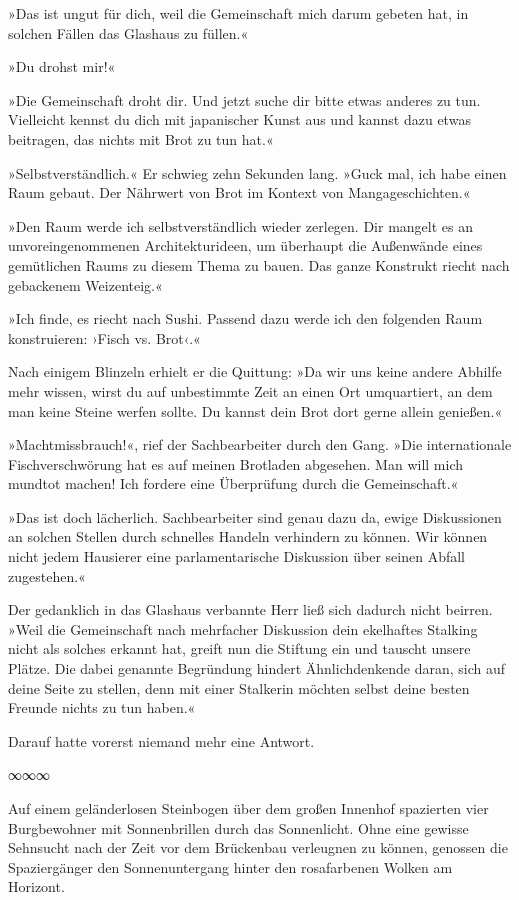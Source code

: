 »Das ist ungut für dich, weil die Gemeinschaft mich darum gebeten hat, in solchen Fällen das Glashaus zu füllen.«

»Du drohst mir!«

»Die Gemeinschaft droht dir. Und jetzt suche dir bitte etwas anderes zu tun. Vielleicht kennst du dich mit japanischer Kunst aus und kannst dazu etwas beitragen, das nichts mit Brot zu tun hat.«

»Selbstverständlich.« Er schwieg zehn Sekunden lang. »Guck mal, ich habe einen Raum gebaut. Der Nährwert von Brot im Kontext von Mangageschichten.«

»Den Raum werde ich selbstverständlich wieder zerlegen. Dir mangelt es an unvoreingenommenen Architekturideen, um überhaupt die Außenwände eines gemütlichen Raums zu diesem Thema zu bauen. Das ganze Konstrukt riecht nach gebackenem Weizenteig.«

»Ich finde, es riecht nach Sushi. Passend dazu werde ich den folgenden Raum konstruieren: ›Fisch vs. Brot‹.«

Nach einigem Blinzeln erhielt er die Quittung: »Da wir uns keine andere Abhilfe mehr wissen, wirst du auf unbestimmte Zeit an einen Ort umquartiert, an dem man keine Steine werfen sollte. Du kannst dein Brot dort gerne allein genießen.«

»Machtmissbrauch!«, rief der Sachbearbeiter durch den Gang. »Die internationale Fischverschwörung hat es auf meinen Brotladen abgesehen. Man will mich mundtot machen! Ich fordere eine Überprüfung durch die Gemeinschaft.«

»Das ist doch lächerlich. Sachbearbeiter sind genau dazu da, ewige Diskussionen an solchen Stellen durch schnelles Handeln verhindern zu können. Wir können nicht jedem Hausierer eine parlamentarische Diskussion über seinen Abfall zugestehen.«

Der gedanklich in das Glashaus verbannte Herr ließ sich dadurch nicht beirren. »Weil die Gemeinschaft nach mehrfacher Diskussion dein ekelhaftes Stalking nicht als solches erkannt hat, greift nun die Stiftung ein und tauscht unsere Plätze. Die dabei genannte Begründung hindert Ähnlichdenkende daran, sich auf deine Seite zu stellen, denn mit einer Stalkerin möchten selbst deine besten Freunde nichts zu tun haben.«

Darauf hatte vorerst niemand mehr eine Antwort.

\begin{center}
	∞∞∞
\end{center}

Auf einem geländerlosen Steinbogen über dem großen Innenhof spazierten vier Burgbewohner mit Sonnenbrillen durch das Sonnenlicht. Ohne eine gewisse Sehnsucht nach der Zeit vor dem Brückenbau verleugnen zu können, genossen die Spaziergänger den Sonnenuntergang hinter den rosafarbenen Wolken am Horizont.

